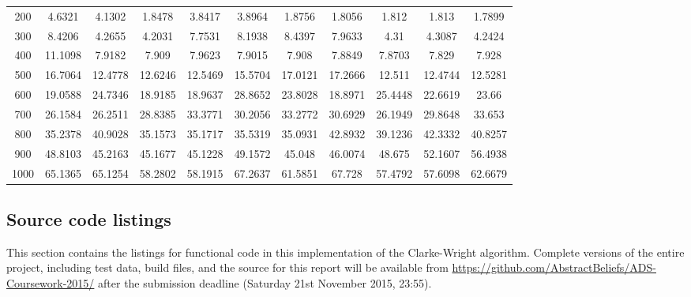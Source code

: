 \documentclass[a4paper]{article}
\begin{document}
\begin{minipage}{\textwidth}
\begin{tabular}{ c c c c c c c c c c c }
                200  & 4.6321  & 4.1302        & 1.8478        & 3.8417        & 3.8964        & 1.8756        & 1.8056        & 1.812         & 1.813         & 1.7899    \\
                300  & 8.4206  & 4.2655        & 4.2031        & 7.7531        & 8.1938        & 8.4397        & 7.9633        & 4.31          & 4.3087        & 4.2424    \\
                400  & 11.1098 & 7.9182        & 7.909         & 7.9623        & 7.9015        & 7.908         & 7.8849        & 7.8703        & 7.829         & 7.928     \\
                500  & 16.7064 & 12.4778       & 12.6246       & 12.5469       & 15.5704       & 17.0121       & 17.2666       & 12.511        & 12.4744       & 12.5281   \\
                600  & 19.0588 & 24.7346       & 18.9185       & 18.9637       & 28.8652       & 23.8028       & 18.8971       & 25.4448       & 22.6619       & 23.66     \\
                700  & 26.1584 & 26.2511       & 28.8385       & 33.3771       & 30.2056       & 33.2772       & 30.6929       & 26.1949       & 29.8648       & 33.653    \\
                800  & 35.2378 & 40.9028       & 35.1573       & 35.1717       & 35.5319       & 35.0931       & 42.8932       & 39.1236       & 42.3332       & 40.8257   \\
                900  & 48.8103 & 45.2163       & 45.1677       & 45.1228       & 49.1572       & 45.048        & 46.0074       & 48.675        & 52.1607       & 56.4938   \\
                1000 & 65.1365 & 65.1254       & 58.2802       & 58.1915       & 67.2637       & 61.5851       & 67.728        & 57.4792       & 57.6098       & 62.6679   \\
                \hline
            \end{tabular}
        \end{minipage}

        \subsection{Source code listings}
            This section contains the listings for functional code in this implementation of the Clarke-Wright algorithm.
            Complete versions of the entire project, including test data, build files, and the source for this report will be available from
            \url{https://github.com/AbstractBeliefs/ADS-Coursework-2015/} after the submission deadline (Saturday 21st November 2015, 23:55).
\end{document}
